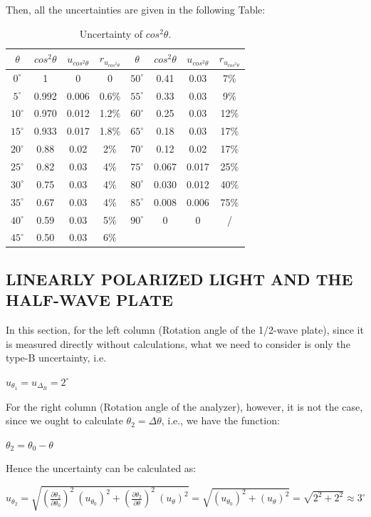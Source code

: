 \documentclass[a4paper,12pt]{article}
\begin{document}
\begin{appendices}
\begin{itemize}
	Then, all the uncertainties are given in the following Table:
	\begin{table}[h]
	\begin{center}
	\begin{tabular}{|c|c|c|c||c|c|c|c|}
	\hline
	$\theta$ & $cos^2\theta$ & $u_{cos^2\theta}$ & $r_{u_{cos^2\theta}}$ & $\theta$ & $cos^2\theta$ & $u_{cos^2\theta}$ & $r_{u_{cos^2\theta}}$ \\
	\hline
	$0^{\circ}$ & 1 & 0 & 0 & $50^{\circ}$ & 0.41 & 0.03 & 7$\%$\\
	\hline 
	$5^{\circ}$ & 0.992 & 0.006 & 0.6$\%$ & $55^{\circ}$ & 0.33 & 0.03 & 9$\%$\\
	\hline 
	$10^{\circ}$ & 0.970 & 0.012 & 1.2$\%$ & $60^{\circ}$ & 0.25 & 0.03 & 12$\%$\\
	\hline 
	$15^{\circ}$ & 0.933 & 0.017 & 1.8$\%$ & $65^{\circ}$ & 0.18 & 0.03 & 17$\%$\\
	\hline 
	$20^{\circ}$ & 0.88 & 0.02 & 2$\%$ & $70^{\circ}$ & 0.12 & 0.02 & 17$\%$\\
	\hline 
	$25^{\circ}$ & 0.82 & 0.03 & 4$\%$ & $75^{\circ}$ & 0.067 & 0.017 & 25$\%$\\
	\hline 
	$30^{\circ}$ & 0.75 & 0.03 & 4$\%$ & $80^{\circ}$ & 0.030 & 0.012 & 40$\%$\\
	\hline 
	$35^{\circ}$ & 0.67 & 0.03 & 4$\%$ & $85^{\circ}$ & 0.008 & 0.006 & 75$\%$\\
	\hline 
	$40^{\circ}$ & 0.59 & 0.03 & 5$\%$ & $90^{\circ}$ & 0 & 0 & /\\
	\hline 
	$45^{\circ}$ & 0.50 & 0.03 & 6$\%$ &  &  & & \\
	\hline 
	\end{tabular}
	\caption{Uncertainty of $cos^2\theta$.}
	\end{center}
	\end{table}
	\end{itemize}
	
	\subsection{\textsc{LINEARLY POLARIZED LIGHT AND THE HALF-WAVE PLATE}}
	In this section, for the left column (Rotation angle of the 1/2-wave plate), since it is measured directly without calculations, what we need to consider is only the type-B uncertainty, i.e.
	\begin{center}
	$u_{\theta_1} = u_{\Delta_B} = 2^{\circ}$
	\end{center}
	\par For the right column (Rotation angle of the analyzer), however, it is not the case, since we ought to calculate $\theta_2 = \Delta \theta$, i.e., we have the function:
	\begin{center}
	$\theta_2 = \theta_0 - \theta$
	\end{center}
	Hence the uncertainty can be calculated as:
	\begin{center}
	$\displaystyle u_{\theta_2} = \sqrt{(\frac{\partial \theta_2}{\partial \theta_0})^2~(u_{\theta_0})^2 + (\frac{\partial \theta_2}{\partial \theta})^2~(u_{\theta})^2} = \sqrt{(u_{\theta_0})^2 + (u_{\theta})^2} = \sqrt{2^2+2^2} \approx 3 ^{\circ}$
	\end{center}
	

\end{appendices}
\end{document}
